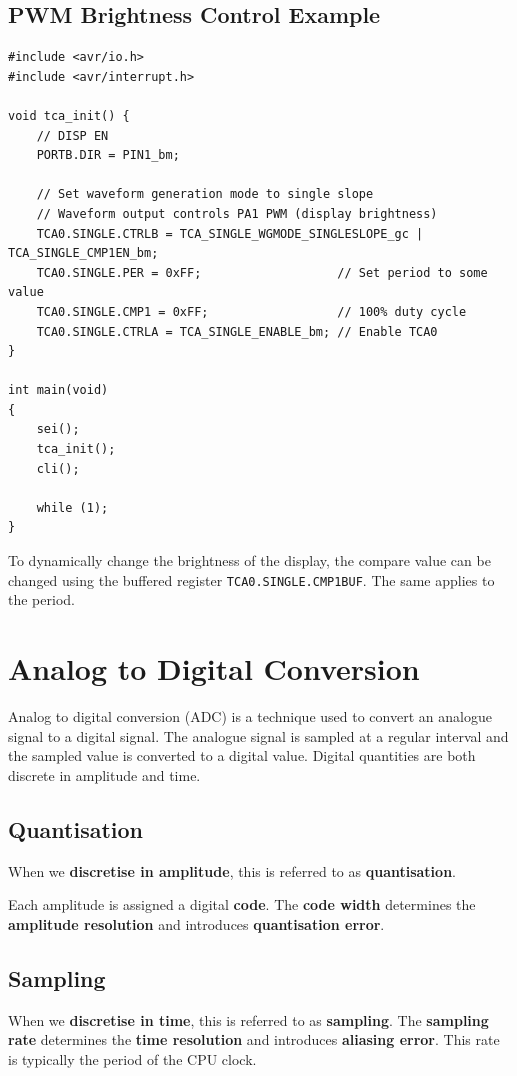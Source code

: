 \documentclass[a4paper]{report}
\begin{document}
\subsection{PWM Brightness Control Example}
\begin{verbatim}
#include <avr/io.h>
#include <avr/interrupt.h>

void tca_init() {
    // DISP EN
    PORTB.DIR = PIN1_bm;

    // Set waveform generation mode to single slope
    // Waveform output controls PA1 PWM (display brightness)
    TCA0.SINGLE.CTRLB = TCA_SINGLE_WGMODE_SINGLESLOPE_gc | TCA_SINGLE_CMP1EN_bm;
    TCA0.SINGLE.PER = 0xFF;                   // Set period to some value
    TCA0.SINGLE.CMP1 = 0xFF;                  // 100% duty cycle
    TCA0.SINGLE.CTRLA = TCA_SINGLE_ENABLE_bm; // Enable TCA0
}

int main(void)
{
    sei();
    tca_init();
    cli();

    while (1);
}
\end{verbatim}
To dynamically change the brightness of the display, the compare value can be changed
using the buffered register \texttt{TCA0.SINGLE.CMP1BUF}. The same applies to the
period.
\section{Analog to Digital Conversion}
Analog to digital conversion (ADC) is a technique used to convert an analogue signal
to a digital signal. The analogue signal is sampled at a regular interval and the
sampled value is converted to a digital value.
Digital quantities are both discrete in amplitude and time.
\subsection{Quantisation}
When we \textbf{discretise in amplitude}, this is referred to as \textbf{quantisation}.

Each amplitude is assigned a digital \textbf{code}. The \textbf{code width}
determines the \textbf{amplitude resolution} and introduces \textbf{quantisation error}.
\subsection{Sampling}
When we \textbf{discretise in time}, this is referred to as \textbf{sampling}.
The \textbf{sampling rate} determines the \textbf{time resolution} and introduces \textbf{aliasing error}.
This rate is typically the period of the CPU clock.
\end{document}
